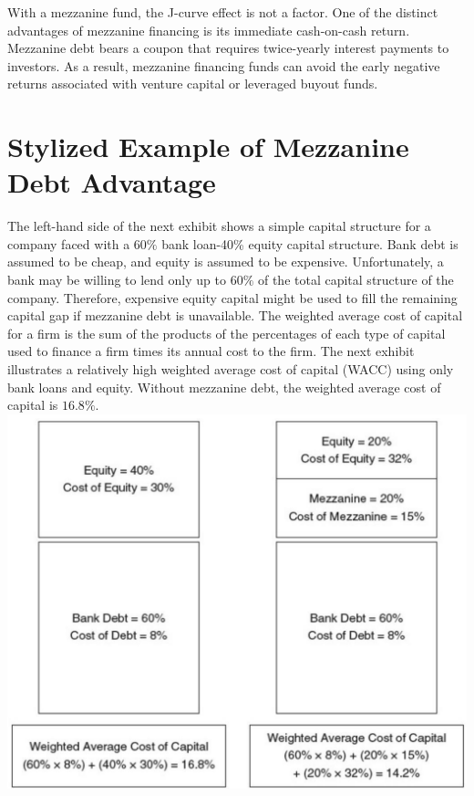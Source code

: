 \documentclass[11pt]{article}
\begin{document}
With a mezzanine fund, the J-curve effect is not a factor. One of the distinct advantages of mezzanine financing is its immediate cash-on-cash return. Mezzanine debt bears a coupon that requires twice-yearly interest payments to investors. As a result, mezzanine financing funds can avoid the early negative returns associated with venture capital or leveraged buyout funds.

\section*{Stylized Example of Mezzanine Debt Advantage}
The left-hand side of the next exhibit shows a simple capital structure for a company faced with a $60 \%$ bank loan-40\% equity capital structure. Bank debt is assumed to be cheap, and equity is assumed to be expensive. Unfortunately, a bank may be willing to lend only up to $60 \%$ of the total capital structure of the company. Therefore, expensive equity capital might be used to fill the remaining capital gap if mezzanine debt is unavailable. The weighted average cost of capital for a firm is the sum of the products of the percentages of each type of capital used to finance a firm times its annual cost to the firm. The next exhibit illustrates a relatively high weighted average cost of capital (WACC) using only bank loans and equity. Without mezzanine debt, the weighted average cost of capital is $16.8 \%$.\\
\includegraphics[max width=\textwidth, center]{2024_04_10_62fc48f41306c58a4ec6g-3}
\end{document}
